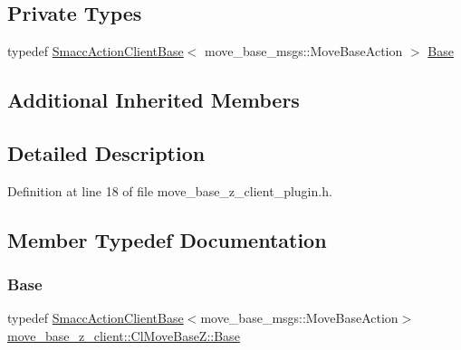 \subsection*{Private Types}
\begin{DoxyCompactItemize}
\item 
typedef \hyperlink{classsmacc_1_1client__bases_1_1SmaccActionClientBase_af38f27dd26f8a87fea6b3eaa4a84e604}{Smacc\+Action\+Client\+Base}$<$ move\+\_\+base\+\_\+msgs\+::\+Move\+Base\+Action $>$ \hyperlink{classmove__base__z__client_1_1ClMoveBaseZ_a5446f4fb56caf7c8de8dd3bd34ae64d6}{Base}
\end{DoxyCompactItemize}
\subsection*{Additional Inherited Members}


\subsection{Detailed Description}


Definition at line 18 of file move\+\_\+base\+\_\+z\+\_\+client\+\_\+plugin.\+h.



\subsection{Member Typedef Documentation}
\mbox{\label{classmove__base__z__client_1_1ClMoveBaseZ_a5446f4fb56caf7c8de8dd3bd34ae64d6}} 
\subsubsection{\texorpdfstring{Base}{Base}}
{\footnotesize\ttfamily typedef \hyperlink{classsmacc_1_1client__bases_1_1SmaccActionClientBase_af38f27dd26f8a87fea6b3eaa4a84e604}{Smacc\+Action\+Client\+Base}$<$move\+\_\+base\+\_\+msgs\+::\+Move\+Base\+Action$>$ \hyperlink{classmove__base__z__client_1_1ClMoveBaseZ_a5446f4fb56caf7c8de8dd3bd34ae64d6}{move\+\_\+base\+\_\+z\+\_\+client\+::\+Cl\+Move\+Base\+Z\+::\+Base}\hspace{0.3cm}{\ttfamily [private]}}



